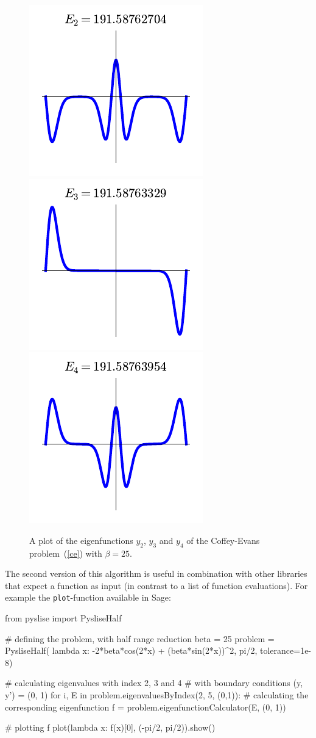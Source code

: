 \begin{figure}
  \begin{center}
    \includegraphics[width=.32\textwidth]{img/chapter2/article/CE_2.pdf}
    \includegraphics[width=.32\textwidth]{img/chapter2/article/CE_3.pdf}
    \includegraphics[width=.32\textwidth]{img/chapter2/article/CE_4.pdf}
  \end{center}
  \caption{\label{ce_fig}A plot of the eigenfunctions $y_2$, $y_3$ and $y_4$ of the Coffey-Evans problem~(\ref{ce}) with $\beta=25$.}
\end{figure}

The second version of this algorithm is useful in combination with other libraries that expect a function as input (in contrast to a list of function evaluations). For example the \texttt{plot}-function available in Sage:
\begin{python}
  from pyslise import PysliseHalf

  # defining the problem, with half range reduction
  beta = 25
  problem = PysliseHalf(
      lambda x: -2*beta*cos(2*x) + (beta*sin(2*x))^2,
      pi/2, tolerance=1e-8)
  
  # calculating eigenvalues with index 2, 3 and 4
  # with boundary conditions (y, y') = (0, 1)
  for i, E in problem.eigenvaluesByIndex(2, 5, (0,1)):
      # calculating the corresponding eigenfunction
      f = problem.eigenfunctionCalculator(E, (0, 1))
  
      # plotting f
      plot(lambda x: f(x)[0], (-pi/2, pi/2)).show()
\end{python}

